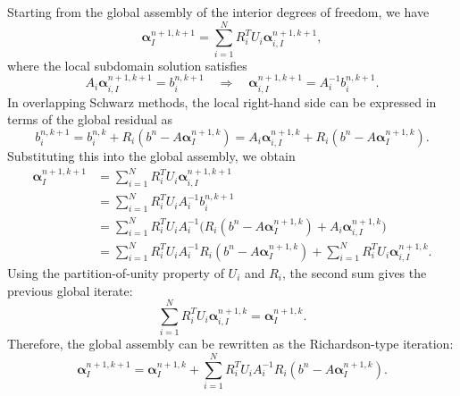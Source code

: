 \documentclass[a4paper, 11pt]{article}
\theoremstyle{remark}
\begin{document}
Starting from the global assembly of the interior degrees of freedom, we have
\begin{equation*}
    \boldsymbol{\alpha}_I^{n+1,k+1} = \sum_{i=1}^N R_i^T U_i \boldsymbol{\alpha}_{i,I}^{n+1,k+1},
\end{equation*}
where the local subdomain solution satisfies
\begin{equation*}
    A_i \boldsymbol{\alpha}_{i,I}^{n+1,k+1} = b_i^{n,k+1} \quad \Rightarrow \quad
    \boldsymbol{\alpha}_{i,I}^{n+1,k+1} = A_i^{-1} b_i^{n,k+1}.
\end{equation*}
In overlapping Schwarz methods, the local right-hand side can be expressed in terms of the global residual as
\begin{equation*}
    b_i^{n,k+1} = b_{i}^{n,k} + R_i (b^n - A \boldsymbol{\alpha}_I^{n+1,k}) = A_i \boldsymbol{\alpha}_{i,I}^{n+1,k} + R_i (b^n - A \boldsymbol{\alpha}_I^{n+1,k}).
\end{equation*}
Substituting this into the global assembly, we obtain
\begin{align*}
    \boldsymbol{\alpha}_I^{n+1,k+1} 
    &= \sum_{i=1}^N R_i^T U_i \boldsymbol{\alpha}_{i,I}^{n+1,k+1} \\
    &= \sum_{i=1}^N R_i^T U_i A_i^{-1} b_i^{n,k+1} \\
    &= \sum_{i=1}^N R_i^T U_i A_i^{-1} \Big( R_i (b^n - A \boldsymbol{\alpha}_I^{n+1,k}) + A_i \boldsymbol{\alpha}_{i,I}^{n+1,k} \Big) \\
    &= \sum_{i=1}^N R_i^T U_i A_i^{-1} R_i (b^n - A \boldsymbol{\alpha}_I^{n+1,k}) + \sum_{i=1}^N R_i^T U_i \boldsymbol{\alpha}_{i,I}^{n+1,k}.
\end{align*}
Using the partition-of-unity property of $U_i$ and $R_i$, the second sum gives the previous global iterate:
\begin{equation*}
    \sum_{i=1}^N R_i^T U_i \boldsymbol{\alpha}_{i,I}^{n+1,k} = \boldsymbol{\alpha}_I^{n+1,k}.
\end{equation*}
Therefore, the global assembly can be rewritten as the Richardson-type iteration:
\begin{equation*}
    \boldsymbol{\alpha}_I^{n+1,k+1} = \boldsymbol{\alpha}_I^{n+1,k} + \sum_{i=1}^N R_i^T U_i A_i^{-1} R_i (b^n - A \boldsymbol{\alpha}_I^{n+1,k}).
\end{equation*}


\end{document}

